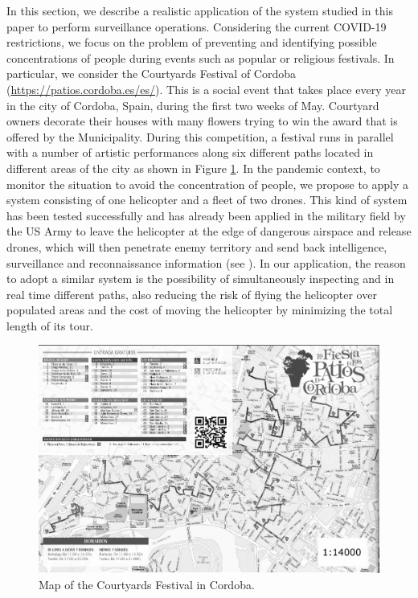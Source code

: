 \documentclass[10pt,a4paper]{elsarticle}
\newcommand{\EN}[1]{{\color{black}#1}}
\begin{document}
\noindent
In this section, we describe a realistic application of the system studied in this paper to perform surveillance operations. Considering the current COVID-19 restrictions, we focus on the problem of preventing and identifying possible concentrations of people during events such as popular or religious festivals. In particular, we consider the Courtyards Festival of Cordoba (\url{https://patios.cordoba.es/es/}). This is a social event that takes place every year in the city of Cordoba, Spain, during the first two weeks of May. Courtyard owners decorate their houses with many flowers trying to win the award that is offered by the \EN{Municipality}. During this competition, a festival runs in parallel with a number of artistic performances along six different paths located in different areas \EN{of} the city as shown in Figure \ref{fig:mapPF}.
In the pandemic context, to monitor the situation to avoid the concentration of people, we propose to apply a system consisting of one helicopter and a fleet of two drones.
This kind of system has been \EN{tested} successfully and has \EN{already been} applied in the military field by the US Army to leave the helicopter at the edge of dangerous airspace and release drones, which will then penetrate enemy territory and send back intelligence, surveillance and reconnaissance information (see \cite{FGA}).
In our application, the reason to adopt a similar system is the possibility \EN{of simultaneously inspecting} and in real time different paths, also reducing the risk of flying the helicopter over populated areas and the cost of moving the helicopter by minimizing the total length of its tour.

\begin{figure}[h!]
	\centering
	\includegraphics[width=0.6\linewidth]{first_gray.png}
	\caption{Map of the Courtyards Festival in Cordoba. \label{fig:mapPF}}
\end{figure}
\end{document}
